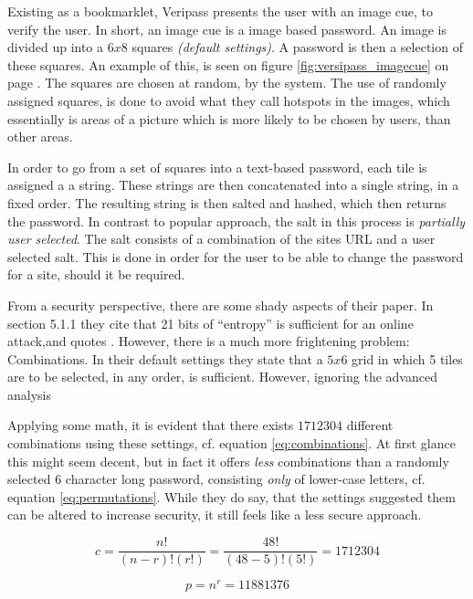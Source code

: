 			Existing as a bookmarklet, Veripass presents the user with an image cue, to verify the user. In short, an image cue is a image based password. An image is divided up into a $6x8$ squares \emph{(default settings)}. A password is then a selection of these squares. An example of this, is seen on figure \ref{fig:versipass_imagecue} on page \pageref{fig:versipass_imagecue}. The squares are chosen at random, by the system. The use of randomly assigned squares, is done to avoid what they call hotspots in the images, which essentially is areas of a picture which is more likely to be chosen by users, than other areas. 

			In order to go from a set of squares into a text-based password, each tile is assigned a a string. These strings are then concatenated into a single string, in a fixed order. The resulting string is then salted and hashed, which then returns the password. In contrast to popular approach, the salt in this process is \emph{ partially user selected}. The salt consists of a combination of the sites URL and a user selected salt. This is done in order for the user to be able to change the password for a site, should it be required.

			From a security perspective, there are some shady aspects of their paper. In section 5.1.1 they cite that 21 bits of ``entropy'' is sufficient for an online attack,and quotes \cite{florencio2014}. However, there is a much more frightening problem: Combinations. In their default settings they state that a $5x6$ grid in which 5 tiles are to be selected, in any order, is sufficient. However, ignoring the advanced analysis

			Applying some math, it is evident that there exists $1712304$ different combinations using these settings, cf. equation \ref{eq:combinations}. At first glance this might seem decent, but in fact it offers \emph{less} combinations than a randomly selected $6$ character long password, consisting \emph{only} of lower-case letters, cf. equation \ref{eq:permutations}. While they do say, that the settings suggested them can be altered to increase security, it still feels like a less secure approach.

			\begin{equation}
				c = \frac{n!}{(n-r)!(r!)} = \frac{48!}{(48-5)!(5!)} = 1712304
				\label{eq:combinations}
			\end{equation}

			\begin{equation}
				p = n^r = 11881376
				\label{eq:permutations}
			\end{equation}

